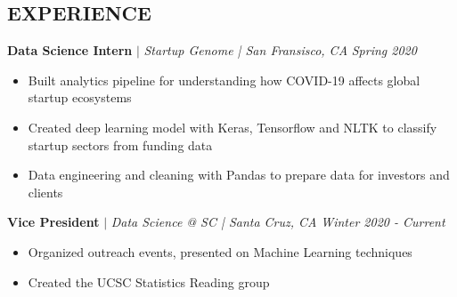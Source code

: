 \documentclass[margin]{res}
\begin{document}
\begin{resume}
\section{EXPERIENCE} 
    \textbf{Data Science Intern} $\mid$ \textit{Startup Genome | San Fransisco, CA} \hfill {\sl Spring 2020}
    \begin{itemize}
        \item Built analytics pipeline for understanding how COVID-19 affects global startup ecosystems
        \item Created deep learning model with Keras, Tensorflow and NLTK to classify startup sectors from funding data 
        \item Data engineering and cleaning with Pandas to prepare data for investors and clients
    \end{itemize} \vspace*{-10pt}

    \textbf{Vice President} $\mid$ \textit{Data Science @ SC | Santa Cruz, CA} \hfill {\sl Winter 2020 - Current}
    \begin{itemize}
        \item Organized outreach events, presented on Machine Learning techniques
        \item Created the UCSC Statistics Reading group
    \end{itemize} \vspace*{-10pt}

\end{resume}
\end{document}
